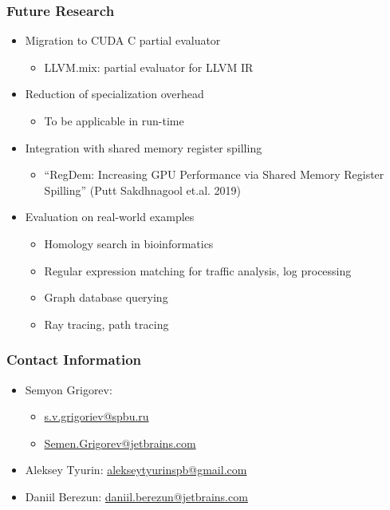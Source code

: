 \documentclass[xcolor=table]{beamer}
\begin{document}
\begin{frame}[fragile] \frametitle{Future Research}
  \begin{itemize}
    \item Migration to CUDA C partial evaluator
    \begin{itemize}
      \item LLVM.mix: partial evaluator for LLVM IR
    \end{itemize}
    \pause
    \item Reduction of specialization overhead
    \begin{itemize}
      \item To be applicable in run-time
    \end{itemize}
    \pause
    \item Integration with shared memory register spilling
    \begin{itemize}
      \item ``RegDem: Increasing GPU Performance via Shared Memory Register Spilling'' (Putt Sakdhnagool et.al. 2019)
    \end{itemize}
    \pause
    \item Evaluation on real-world examples
    \begin{itemize}
      \item Homology search in bioinformatics
      \item Regular expression matching for traffic analysis, log processing
      \item Graph database querying
      \item Ray tracing, path tracing
    \end{itemize}
  \end{itemize}
\end{frame}

\begin{frame}
\frametitle{Contact Information}
\begin{itemize}
  \item Semyon Grigorev:
    \begin{itemize}
      \item \href{mailto:s.v.grigoriev@spbu.ru}{s.v.grigoriev@spbu.ru}
      \item \href{mailto:Semen.Grigorev@jetbrains.com}{Semen.Grigorev@jetbrains.com}
    \end{itemize}

  \item Aleksey Tyurin: \href{mailto:alekseytyurinspb@gmail.com}{alekseytyurinspb@gmail.com}
  \item Daniil Berezun: \href{mailto:daniil.berezun@jetbrains.com}{daniil.berezun@jetbrains.com}

\vspace{0.5cm}
\end{itemize}
\vspace{0.1cm}
\end{frame}
\end{document}
